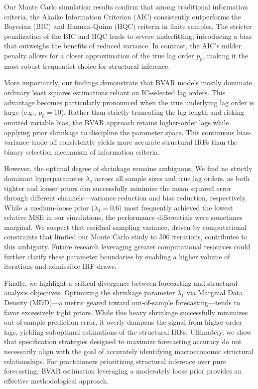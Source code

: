 \documentclass[12pt, a4paper]{article}
\begin{document}
Our Monte Carlo simulation results confirm that among traditional information criteria, the Akaike Information Criterion (AIC) consistently outperforms the Bayesian (BIC) and Hannan-Quinn (HQC) criteria in finite samples. The stricter penalization of the BIC and HQC leads to severe underfitting, introducing a bias that outweighs the benefits of reduced variance. In contrast, the AIC's milder penalty allows for a closer approximation of the true lag order $p_0$, making it the most robust frequentist choice for structural inference. 

More importantly, our findings demonstrate that BVAR models mostly dominate ordinary least squares estimations reliant on IC-selected lag orders. This advantage becomes particularly pronounced when the true underlying lag order is large (e.g., $p_0 = 10$). Rather than strictly truncating the lag length and risking omitted variable bias, the BVAR approach retains higher-order lags while applying prior shrinkage to discipline the parameter space. This continuous bias-variance trade-off consistently yields more accurate structural IRFs than the binary selection mechanism of information criteria.

However, the optimal degree of shrinkage remains ambiguous. We find no strictly dominant hyperparameter $\lambda_1$ across all sample sizes and true lag orders, as both tighter and looser priors can successfully minimize the mean squared error through different channels—variance reduction and bias reduction, respectively. While a medium-loose prior ($\lambda_1 = 0.6$) most frequently achieved the lowest relative MSE in our simulations, the performance differentials were sometimes marginal. We suspect that residual sampling variance, driven by computational constraints that limited our Monte Carlo study to 500 iterations, contributes to this ambiguity. Future research leveraging greater computational resources could further clarify these parameter boundaries by enabling a higher volume of iterations and admissible IRF draws.

Finally, we highlight a critical divergence between forecasting and structural analysis objectives. Optimizing the shrinkage parameter $\lambda_1$ via Marginal Data Density (MDD)—a metric geared toward out-of-sample forecasting—tends to favor excessively tight priors. While this heavy shrinkage successfully minimizes out-of-sample prediction error, it overly dampens the signal from higher-order lags, yielding suboptimal estimations of the structural IRFs. Ultimately, we show that specification strategies designed to maximize forecasting accuracy do not necessarily align with the goal of accurately identifying macroeconomic structural relationships. For practitioners prioritizing structural inference over pure forecasting, BVAR estimation leveraging a moderately loose prior provides an effective methodological approach.
\newpage
\end{document}
